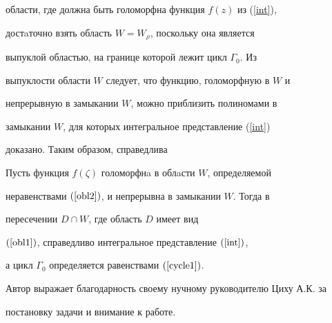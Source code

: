 области, где должна быть голоморфна функция $f(z)$ из (\ref{int}),


достaточно взять область $W=W_{\rho}$, поскольку она является


выпуклой областью, на границе которой лежит цикл $\Gamma_0$. Из


выпуклости области $W$ следует, что функцию, голоморфную в $W$ и


непрерывную в замыкании $W$, можно приблизить полиномами в


замыкании $W$, для которых интегральное представление (\ref{int})


доказано. Таким образом, справедлива








\begin{thmnonum}


Пусть функция $f(\zeta)$ голоморфнa в облaсти $W$, определяемой


неравенствами $(\ref{obl2})$, и непрерывна в замыкании $W$. Тогда  в


пересечении $D\cap W$, где область $D$ имеет вид


$(\ref{obl1})$, справедливо интегральное представление $(\ref{int})$,


а цикл $\Gamma_0$ определяется равенствами $(\ref{cycle1})$.


\end{thmnonum}








Автор выражает благодарность своему нучному руководителю Циху А.К. за 


постановку задачи и внимание к работе.





